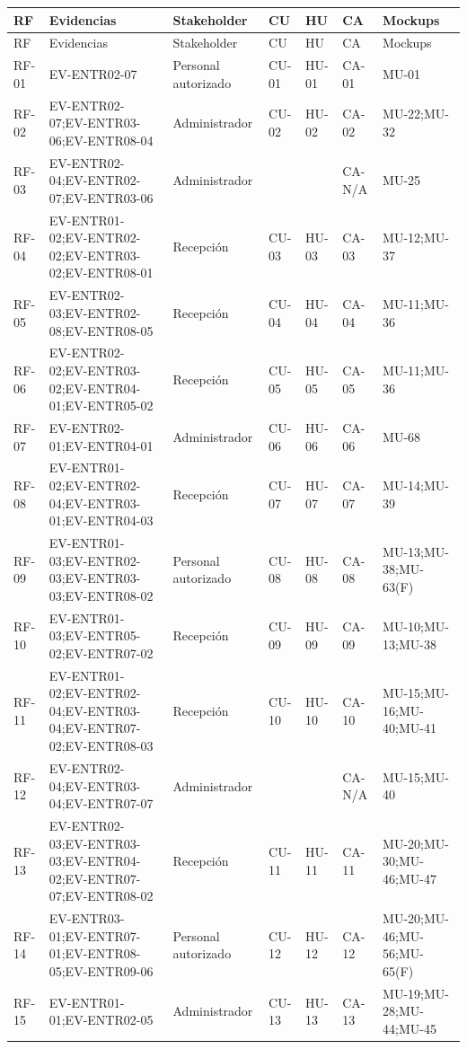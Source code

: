 \documentclass[11pt,a4paper,twoside]{article}
\begin{document}
\begin{landscape}\scriptsize
\begin{longtable}{p{2.2cm}p{4.0cm}p{4.0cm}p{2.2cm}p{2.2cm}p{2.2cm}p{3.5cm}}
\toprule RF & Evidencias & Stakeholder & CU & HU & CA & Mockups \\ \midrule\endfirsthead
\toprule RF & Evidencias & Stakeholder & CU & HU & CA & Mockups \\ \midrule\endhead
RF-01 & EV-ENTR02-07 & Personal autorizado & CU-01 & HU-01 & CA-01 & MU-01 \\
RF-02 & EV-ENTR02-07;EV-ENTR03-06;EV-ENTR08-04 & Administrador & CU-02 & HU-02 & CA-02 & MU-22;MU-32 \\
RF-03 & EV-ENTR02-04;EV-ENTR02-07;EV-ENTR03-06 & Administrador &  &  & CA-N/A & MU-25 \\
RF-04 & EV-ENTR01-02;EV-ENTR02-02;EV-ENTR03-02;EV-ENTR08-01 & Recepción & CU-03 & HU-03 & CA-03 & MU-12;MU-37 \\
RF-05 & EV-ENTR02-03;EV-ENTR02-08;EV-ENTR08-05 & Recepción & CU-04 & HU-04 & CA-04 & MU-11;MU-36 \\
RF-06 & EV-ENTR02-02;EV-ENTR03-02;EV-ENTR04-01;EV-ENTR05-02 & Recepción & CU-05 & HU-05 & CA-05 & MU-11;MU-36 \\
RF-07 & EV-ENTR02-01;EV-ENTR04-01 & Administrador & CU-06 & HU-06 & CA-06 & MU-68 \\
RF-08 & EV-ENTR01-02;EV-ENTR02-04;EV-ENTR03-01;EV-ENTR04-03 & Recepción & CU-07 & HU-07 & CA-07 & MU-14;MU-39 \\
RF-09 & EV-ENTR01-03;EV-ENTR02-03;EV-ENTR03-03;EV-ENTR08-02 & Personal autorizado & CU-08 & HU-08 & CA-08 & MU-13;MU-38;MU-63(F) \\
RF-10 & EV-ENTR01-03;EV-ENTR05-02;EV-ENTR07-02 & Recepción & CU-09 & HU-09 & CA-09 & MU-10;MU-13;MU-38 \\
RF-11 & EV-ENTR01-02;EV-ENTR02-04;EV-ENTR03-04;EV-ENTR07-02;EV-ENTR08-03 & Recepción & CU-10 & HU-10 & CA-10 & MU-15;MU-16;MU-40;MU-41 \\
RF-12 & EV-ENTR02-04;EV-ENTR03-04;EV-ENTR07-07 & Administrador &  &  & CA-N/A & MU-15;MU-40 \\
RF-13 & EV-ENTR02-03;EV-ENTR03-03;EV-ENTR04-02;EV-ENTR07-07;EV-ENTR08-02 & Recepción & CU-11 & HU-11 & CA-11 & MU-20;MU-30;MU-46;MU-47 \\
RF-14 & EV-ENTR03-01;EV-ENTR07-01;EV-ENTR08-05;EV-ENTR09-06 & Personal autorizado & CU-12 & HU-12 & CA-12 & MU-20;MU-46;MU-56;MU-65(F) \\
RF-15 & EV-ENTR01-01;EV-ENTR02-05 & Administrador & CU-13 & HU-13 & CA-13 & MU-19;MU-28;MU-44;MU-45 \\

\end{longtable}
\end{landscape}
\end{document}
